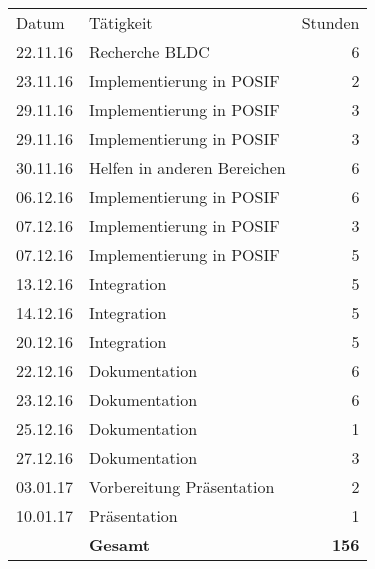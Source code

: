 \begin{minipage}{0.5\textwidth}
    \begin{tabular}{lp{4cm}r}
       Datum& Tätigkeit&Stunden\\
       
       22.11.16&Recherche BLDC&6 \\
       23.11.16&Implementierung in POSIF&2 \\
       
       29.11.16&Implementierung in POSIF&3 \\
       29.11.16&Implementierung in POSIF&3 \\
       30.11.16&Helfen in anderen \newline
			    Bereichen&6 \\
       
       06.12.16&Implementierung in POSIF&6 \\
       07.12.16&Implementierung in POSIF&3 \\
       07.12.16&Implementierung in POSIF&5 \\
       
       13.12.16&Integration&5 \\
       14.12.16&Integration&5 \\ 
            
       20.12.16&Integration&5 \\
       
       22.12.16&Dokumentation&6 \\
       23.12.16&Dokumentation&6 \\
       25.12.16&Dokumentation&1 \\
       
       
       27.12.16&Dokumentation&3 \\
       03.01.17&Vorbereitung Präsentation&2 \\
       10.01.17&Präsentation&1 \\
       &\textbf{Gesamt}&\textbf{156}
    \end{tabular}
\end{minipage}